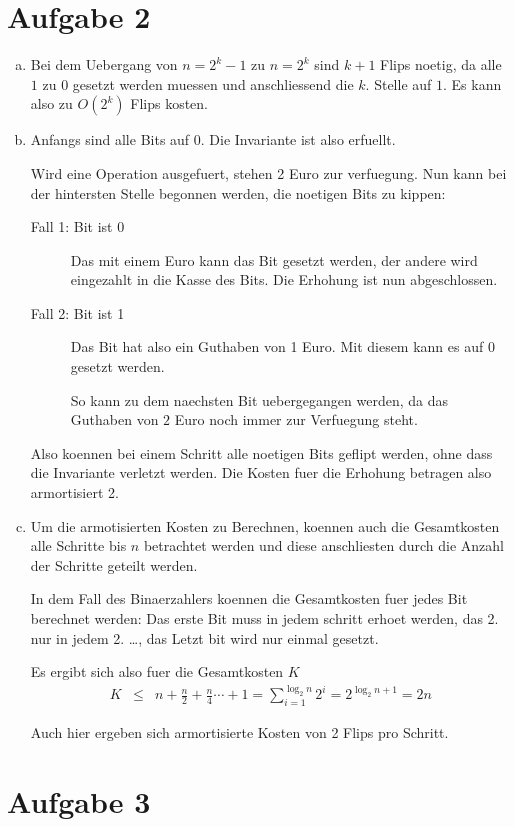 \section*{Aufgabe 2}
\begin{enumerate}[(a)]
\item Bei dem Uebergang von $n = 2^k - 1$ zu $n = 2^k$ sind $k+1$ Flips noetig,
    da alle $1$ zu $0$ gesetzt werden muessen und anschliessend die $k$. Stelle auf $1$.
    Es kann also zu $O(2^k)$ Flips kosten.

\item Anfangs sind alle Bits auf $0$. Die Invariante ist also erfuellt.

    Wird eine Operation ausgefuert, stehen 2 Euro zur verfuegung.
    Nun kann bei der hintersten Stelle begonnen werden, die noetigen Bits zu kippen:
    \begin{description}
    \item[Fall 1: Bit ist 0]
    
    Das mit einem Euro kann das Bit gesetzt werden, der andere wird eingezahlt in die Kasse des Bits.
    Die Erhohung ist nun abgeschlossen.

    \item[Fall 2: Bit ist 1]
    
    Das Bit hat also ein Guthaben von 1 Euro. Mit diesem kann es auf 0 gesetzt werden.

    So kann zu dem naechsten Bit uebergegangen werden, da das Guthaben von $2$
    Euro noch immer zur Verfuegung steht.
    \end{description}

    Also koennen bei einem Schritt alle noetigen Bits geflipt werden, ohne dass die Invariante verletzt werden.
    Die Kosten fuer die Erhohung betragen also armortisiert 2.

    \item 
    Um die armotisierten Kosten zu Berechnen, koennen auch die Gesamtkosten alle Schritte bis $n$ betrachtet werden
    und diese anschliesten durch die Anzahl der Schritte geteilt werden.

    In dem Fall des Binaerzahlers koennen die Gesamtkosten fuer jedes Bit berechnet werden:
    Das erste Bit muss in jedem schritt erhoet werden, das 2. nur in jedem 2. \ldots,
    das Letzt bit wird nur einmal gesetzt.

    Es ergibt sich also fuer die Gesamtkosten $K$
    \begin{eqnarray}
    K &\leq& n + \frac{n}{2} + \frac{n}{4} \cdots + 1 = \sum_{i=1}^{\log_2 n} 2^i = 2^{\log_2 n + 1} = 2n
    \end{eqnarray}

    Auch hier ergeben sich armortisierte Kosten von 2 Flips pro Schritt.
\end{enumerate}

\section*{Aufgabe 3}


